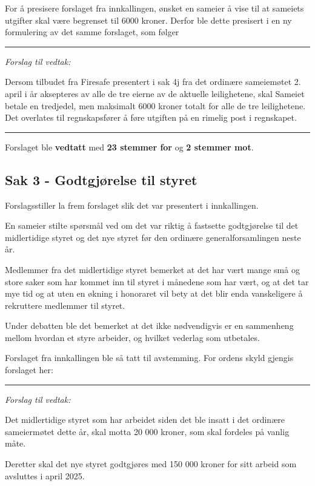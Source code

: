 \documentclass[12pt]{article}
\begin{document}
For å presisere forslaget fra innkallingen, ønsket en sameier å vise til at sameiets utgifter skal
være begrenset til 6000 kroner. Derfor ble dette presisert i en ny formulering av det samme
forslaget, som følger

{\rule{\textwidth}{0.3pt}}

{\em Forslag til vedtak:}

Dersom tilbudet fra Firesafe presentert i sak 4j fra det ordinære
sameiemøtet 2. april i år aksepteres av alle de tre eierne av de aktuelle leilighetene, skal
Sameiet betale en tredjedel, men maksimalt 6000 kroner totalt for alle de tre leilighetene. Det
overlates til regnskapsfører å føre utgiften på en rimelig post i regnskapet.

{\rule{\textwidth}{0.3pt}}

Forslaget ble {\bf vedtatt} med {\bf 23 stemmer for} og {\bf 2 stemmer mot}.

\subsection*{Sak 3 - Godtgjørelse til styret}

Forslagsstiller la frem forslaget slik det var presentert i innkallingen.

En sameier stilte spørsmål ved om det var riktig å fastsette godtgjørelse til det midlertidige
styret og det nye styret før den ordinære generalforsamlingen neste år.

Medlemmer fra det midlertidige styret bemerket at det har vært mange små og store saker som har
kommet inn til styret i månedene som har vært, og at det tar mye tid og at uten en økning i
honoraret vil bety at det blir enda vanskeligere å rekruttere medlemmer til styret.

Under debatten ble det bemerket at det ikke nødvendigvis er en sammenheng mellom hvordan et styre
arbeider, og hvilket vederlag som utbetales.

Forslaget fra innkallingen ble så tatt til avstemming. For ordens skyld gjengis forslaget her:

{\rule{\textwidth}{0.3pt}}

{\em Forslag til vedtak:}

Det midlertidige styret som har arbeidet siden det ble insatt i det ordinære sameiermøtet dette år,
skal motta 20 000 kroner, som skal fordeles på vanlig måte.

Deretter skal det nye styret godtgjøres med 150 000 kroner for sitt arbeid som avsluttes i april
2025.
\end{document}
